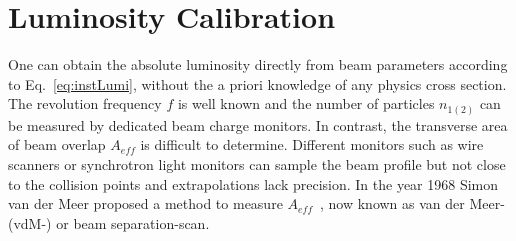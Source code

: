 \section {Luminosity Calibration} \label{sec:lumiCalibration}
One can obtain the absolute luminosity directly from beam parameters according to Eq.~\ref{eq:instLumi}, 
without the a priori knowledge of any physics cross section.
The revolution frequency $f$ is well known and the number of particles
$n_{1(2)}$ can be measured by dedicated beam charge monitors.
In contrast, the transverse area of beam overlap $A_{eff}$ is difficult to determine.
Different monitors such as wire scanners or synchrotron light monitors can sample the beam
profile but not close to the collision points and extrapolations lack precision.
In the year 1968 Simon van der Meer proposed a method to measure $A_{eff}$~\cite{vanderMeer:296752}, now  known as van der Meer- (vdM-) or beam separation-scan.

